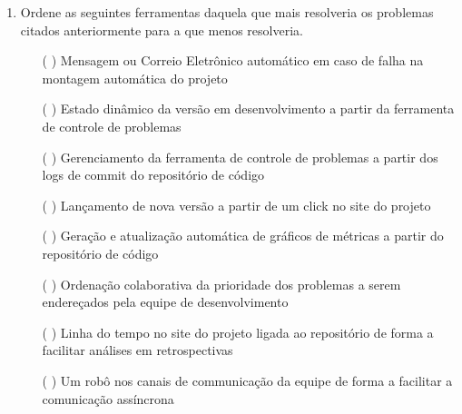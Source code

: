 \begin{enumerate}
\item Ordene as seguintes ferramentas daquela que mais resolveria os
  problemas citados anteriormente para a que menos resolveria.
  \begin{itemize}
  \item[( )] Mensagem ou Correio Eletrônico automático em caso de
    falha na montagem automática do projeto
  \item[( )] Estado dinâmico da versão em desenvolvimento a partir da
    ferramenta de controle de problemas
  \item[( )] Gerenciamento da ferramenta de controle de problemas a
    partir dos logs de commit do repositório de código
  \item[( )] Lançamento de nova versão a partir de um click no site do
    projeto
  \item[( )] Geração e atualização automática de gráficos de métricas
    a partir do repositório de código
  \item[( )] Ordenação colaborativa da prioridade dos problemas a
    serem endereçados pela equipe de desenvolvimento
  \item[( )] Linha do tempo no site do projeto ligada ao repositório
    de forma a facilitar análises em retrospectivas
  \item[( )] Um robô nos canais de communicação da equipe de forma a
    facilitar a comunicação assíncrona
  \end{itemize}
\end{enumerate}

